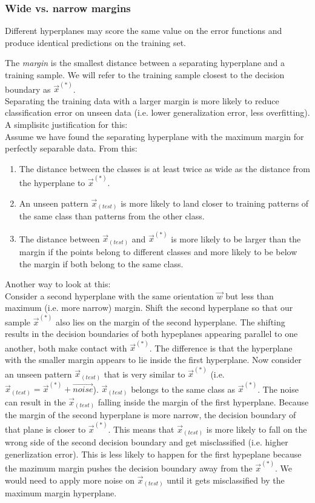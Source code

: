 \begin{frame}\frametitle{Wide vs. narrow margins}

Different hyperplanes may score the same value on the error functions and produce identical predictions on the training set.
    
\end{frame}

\begin{frame}

      The {\em margin} is the smallest distance between a separating hyperplane and a training sample. We will refer to the training sample closest to the decision boundary as $\vec x^{(*)}$.\\
            Separating the training data with a larger margin is more likely to reduce classification error on unseen data (i.e. lower generalization error, less overfitting).
            A simplisitc justification for this: \\
            Assume we have found the separating hyperplane with the maximum margin for perfectly separable data. From this:
            \begin{enumerate}[(1)]
                \item The distance between the classes is at least twice as wide as the distance from the hyperplane to $\vec x^{(*)}$.
                \item An unseen pattern $\vec x_{(test)}$ is more likely to land closer to training patterns of the same class than patterns from the other class.
                \item The distance between $\vec x_{(test)}$ and $\vec x^{(*)}$ is more likely to be larger than the margin if the points belong to different classes and more likely to be below the margin if both belong to the same class.
            \end{enumerate}
            Another way to look at this:\\
            Consider a second hyperplane with the same orientation $\vec w$ but less than maximum (i.e. more narrow) margin. Shift the second hyperplane so that our sample $\vec x^{(*)}$ also lies on the margin of the second hyperplane. The shifting results in the decision boundaries of both hypeplanes appearing parallel to one another, both make contact with $\vec x^{(*)}$. The difference is that the hyperplane with the smaller margin appears to lie inside the first hyperplane. Now consider an unseen pattern $\vec x_{(test)}$ that is very similar to $\vec x^{(*)}$ (i.e. $\vec x_{(test)} = \vec x^{(*)} + \vec {noise}$). $\vec x_{(test)}$ belongs to the same class as $\vec x^{(*)}$. The noise can result in the $\vec x_{(test)}$ falling inside the margin of the first hyperplane. Because the margin of the second hyperplane is more narrow, the decision boundary of that plane is closer to $\vec x^{(*)}$. This means that $\vec x_{(test)}$ is more likely to fall on the wrong side of the second decision boundary and get misclassified (i.e. higher generlization error). This is less likely to happen for the first hypeplane because the mazimum margin pushes the decision boundary away from the $\vec x^{(*)}$. We would need to apply more noise on $\vec x_{(test)}$  until it gets misclassified by the maximum margin hyperplane.\vspace{5cm}

\end{frame}
